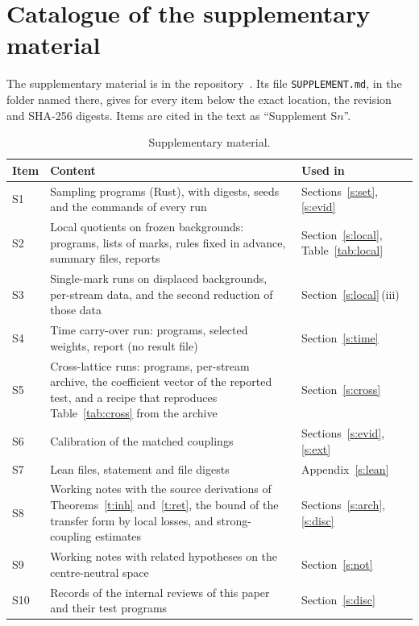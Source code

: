 \section{Catalogue of the supplementary material}\label{app:supp}
The supplementary material is in the repository~\cite{Supp}. Its file \texttt{SUPPLEMENT.md}, in the folder
named there, gives for every item below the exact location, the revision and SHA-256 digests. Items are cited
in the text as ``Supplement S$n$''.

\begin{table}[ht]
\centering\small
\begin{tabular}{@{}l>{\raggedright\arraybackslash}p{}>{\raggedright\arraybackslash}p{}@{}}
\toprule
Item & Content & Used in \\
\midrule
S1 & Sampling programs (Rust), with digests, seeds and the commands of every run & Sections~\ref{s:set}, \ref{s:evid} \\
S2 & Local quotients on frozen backgrounds: programs, lists of marks, rules fixed in advance, summary files, reports & Section~\ref{s:local}, Table~\ref{tab:local} \\
S3 & Single-mark runs on displaced backgrounds, per-stream data, and the second reduction of those data & Section~\ref{s:local}\,(iii) \\
S4 & Time carry-over run: programs, selected weights, report (no result file) & Section~\ref{s:time} \\
S5 & Cross-lattice runs: programs, per-stream archive, the coefficient vector of the reported test, and a recipe that reproduces Table~\ref{tab:cross} from the archive & Section~\ref{s:cross} \\
S6 & Calibration of the matched couplings & Sections~\ref{s:evid}, \ref{s:ext} \\
S7 & Lean files, statement and file digests & Appendix~\ref{s:lean} \\
S8 & Working notes with the source derivations of Theorems~\ref{t:inh} and~\ref{t:ret}, the bound of the transfer form by local losses, and strong-coupling estimates & Sections~\ref{s:arch}, \ref{s:disc} \\
S9 & Working notes with related hypotheses on the centre-neutral space & Section~\ref{s:not} \\
S10 & Records of the internal reviews of this paper and their test programs & Section~\ref{s:disc} \\
\bottomrule
\end{tabular}
\caption{Supplementary material.}\label{tab:supp}
\end{table}

